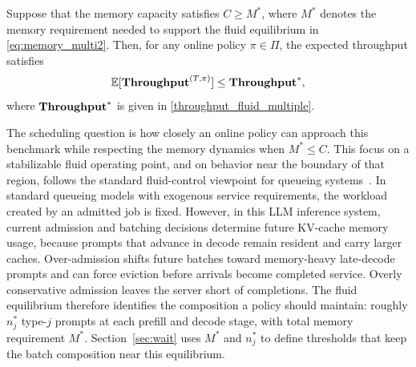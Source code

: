 \begin{proposition}\label{prop::online policy expected throughput upper bound, multiple type}
Suppose that the memory capacity satisfies \(C \geq M^*\), where \(M^*\) denotes the memory requirement needed to support the fluid equilibrium in \eqref{eq:memory_multi2}. Then, for any online policy \(\pi \in \Pi\), the expected throughput satisfies
\[
\mathbb{E}[\textbf{Throughput}^{(T,\pi)}] \leq \textbf{Throughput}^*,
\]
where \(\textbf{Throughput}^*\) is given in \eqref{throughput_fluid_multiple}.
\end{proposition}
The scheduling question is how closely an online policy can approach this benchmark while respecting the memory dynamics when \(M^*\le C\). This focus on a stabilizable fluid operating point, and on behavior near the boundary of that region, follows the standard fluid-control viewpoint for queueing systems~\citep{maglaras2000discrete,bauerle2002optimal,liu2011network}. In standard queueing models with exogenous service requirements, the workload created by an admitted job is fixed. However, in this LLM inference system, current admission and batching decisions determine future KV-cache memory usage, because prompts that advance in decode remain resident and carry larger caches. Over-admission shifts future batches toward memory-heavy late-decode prompts and can force eviction before arrivals become completed service. Overly conservative admission leaves the server short of completions. The fluid equilibrium therefore identifies the composition a policy should maintain: roughly \(n_j^*\) type-\(j\) prompts at each prefill and decode stage, with total memory requirement \(M^*\). Section~\ref{sec:wait} uses \(M^*\) and \(n_j^*\) to define thresholds that keep the batch composition near this equilibrium.



